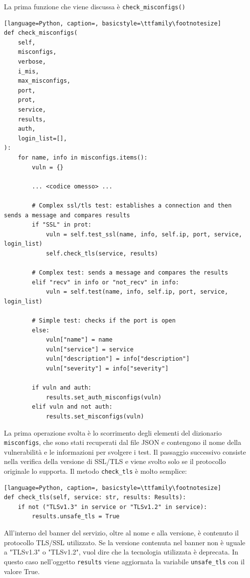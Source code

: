 \documentclass[12pt]{report}
\begin{document}
La prima funzione che viene discussa è \lstinline{check_misconfigs()}
\begin{lstlisting}[language=Python, caption=, basicstyle=\ttfamily\footnotesize]
def check_misconfigs(
    self,
    misconfigs,
    verbose,
    i_mis,
    max_misconfigs,
    port,
    prot,
    service,
    results,
    auth,
    login_list=[],
):
    for name, info in misconfigs.items():
        vuln = {}

        ... <codice omesso> ...

        # Complex ssl/tls test: establishes a connection and then sends a message and compares results
        if "SSL" in prot:
            vuln = self.test_ssl(name, info, self.ip, port, service, login_list)
            self.check_tls(service, results)

        # Complex test: sends a message and compares the results
        elif "recv" in info or "not_recv" in info:
            vuln = self.test(name, info, self.ip, port, service, login_list)

        # Simple test: checks if the port is open
        else:
            vuln["name"] = name
            vuln["service"] = service
            vuln["description"] = info["description"]
            vuln["severity"] = info["severity"]

        if vuln and auth:
            results.set_auth_misconfigs(vuln)
        elif vuln and not auth:
            results.set_misconfigs(vuln)
\end{lstlisting}

La prima operazione svolta è lo scorrimento degli elementi del dizionario \lstinline{misconfigs}, che sono stati recuperati dal file JSON e contengono il nome della vulnerabilità e le informazioni per svolgere i test. Il passaggio successivo consiste nella verifica della versione di SSL/TLS e viene svolto solo se il protocollo originale lo supporta. Il metodo \lstinline{check_tls} è molto semplice:

\begin{lstlisting}[language=Python, caption=, basicstyle=\ttfamily\footnotesize]
def check_tls(self, service: str, results: Results):
    if not ("TLSv1.3" in service or "TLSv1.2" in service):
        results.unsafe_tls = True
\end{lstlisting}

All'interno del banner del servizio, oltre al nome e alla versione, è contenuto il protocollo TLS/SSL utilizzato. Se la versione contenuta nel banner non è uguale a "TLSv1.3" o "TLSv1.2", vuol dire che la tecnologia utilizzata è deprecata. In questo caso nell'oggetto \lstinline{results} viene aggiornata la variabile \lstinline{unsafe_tls} con il valore True.
\end{document}
